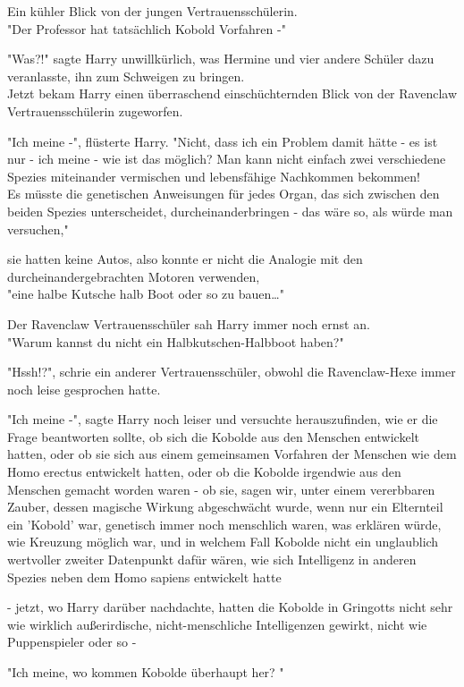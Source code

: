 {Ein kühler Blick von der jungen Vertrauensschülerin.\\ "Der Professor hat tatsächlich Kobold Vorfahren -"

"Was?!" sagte Harry unwillkürlich, was Hermine und vier andere Schüler dazu veranlasste, ihn zum Schweigen zu bringen.\\ Jetzt bekam Harry einen überraschend einschüchternden Blick von der Ravenclaw Vertrauensschülerin zugeworfen.

"Ich meine -", flüsterte Harry. "Nicht, dass ich ein Problem damit hätte - es ist nur - ich meine - wie ist das möglich? Man kann nicht einfach zwei verschiedene Spezies miteinander vermischen und lebensfähige Nachkommen bekommen!\\ Es müsste die genetischen Anweisungen für jedes Organ, das sich zwischen den beiden Spezies unterscheidet, durcheinanderbringen - das wäre so, als würde man versuchen,"

sie hatten keine Autos, also konnte er nicht die Analogie mit den durcheinandergebrachten Motoren verwenden,\\ "eine halbe Kutsche halb Boot oder so zu bauen…"

Der Ravenclaw Vertrauensschüler sah Harry immer noch ernst an.\\ "Warum kannst du nicht ein Halbkutschen-Halbboot haben?"

"Hssh!?", schrie ein anderer Vertrauensschüler, obwohl die Ravenclaw-Hexe immer noch leise gesprochen hatte.

"Ich meine -", sagte Harry noch leiser und versuchte herauszufinden, wie er die Frage beantworten sollte, ob sich die Kobolde aus den Menschen entwickelt hatten, oder ob sie sich aus einem gemeinsamen Vorfahren der Menschen wie dem Homo erectus entwickelt hatten, oder ob die Kobolde irgendwie aus den Menschen gemacht worden waren - ob sie, sagen wir, unter einem vererbbaren Zauber, dessen magische Wirkung abgeschwächt wurde, wenn nur ein Elternteil ein 'Kobold' war, genetisch immer noch menschlich waren, was erklären würde, wie Kreuzung möglich war, und in welchem Fall Kobolde nicht ein unglaublich wertvoller zweiter Datenpunkt dafür wären, wie sich Intelligenz in anderen Spezies neben dem Homo sapiens entwickelt hatte

- jetzt, wo Harry darüber nachdachte, hatten die Kobolde in Gringotts nicht sehr wie wirklich außerirdische, nicht-menschliche Intelligenzen gewirkt, nicht wie Puppenspieler oder so -

"Ich meine, wo kommen Kobolde überhaupt her? "

}
